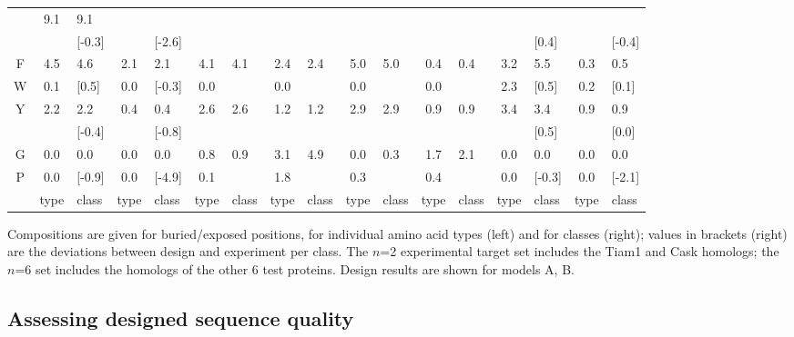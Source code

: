 \documentclass[12pt]{article}
\newcommand{\fn}{\footnotesize}
\begin{document}
\begin{table}
\begin{tabular}{c|clcl|clcl|clcl|clcl}
 & \multirow{2}{*}{9.1} & 9.1\\
 & & [-0.3] & & [-2.6] & & & & & & & & & & [0.4] & & [-0.4]\\ \hline
F  & 4.5 & \multirow{1}{*}{4.6} & 2.1 & \multirow{1}{*}{2.1} & 4.1 & \multirow{2}{*}{4.1} & 2.4 & \multirow{2}{*}{2.4} & 5.0 & \multirow{2}{*}{5.0} & 0.4 & \multirow{2}{*}{0.4} & 3.2 & \multirow{1}{*}{5.5} & 0.3 & \multirow{1}{*}{0.5}\\
W & 0.1 & [0.5] & 0.0 & [-0.3] & 0.0 &  & 0.0 &  & 0.0 &  & 0.0 &  & 2.3 & [0.5] & 0.2 & [0.1]\\
\hline
\multirow{2}{*}{Y} & \multirow{2}{*}{2.2} & 2.2 & \multirow{2}{*}{0.4} & 0.4 & \multirow{2}{*}{2.6} & \multirow{2}{*}{2.6} & \multirow{2}{*}{1.2} & \multirow{2}{*}{1.2} & \multirow{2}{*}{2.9} & \multirow{2}{*}{2.9} & \multirow{2}{*}{0.9} & \multirow{2}{*}{0.9} & \multirow{2}{*}{3.4} & 3.4 & \multirow{2}{*}{0.9} & 0.9\\
 &  & [-0.4] &  & [-0.8] &  &  &  &  &  &  &  &  &  & [0.5] &  & [0.0]\\
\hline
G & 0.0 & \multirow{1}{*}{0.0} & 0.0 & \multirow{1}{*}{0.0} & 0.8 & \multirow{2}{*}{0.9} & 3.1 & \multirow{2}{*}{4.9} & 0.0 & \multirow{2}{*}{0.3} & 1.7 & \multirow{2}{*}{2.1} & 0.0 & \multirow{1}{*}{0.0} & 0.0 & \multirow{1}{*}{0.0}\\
P & 0.0 & [-0.9] & 0.0 & [-4.9] & 0.1 &  & 1.8 &  & 0.3 &  & 0.4 &  & 0.0 & [-0.3] & 0.0 & [-2.1]\\
\hline
 & \fn{type} & \fn{class} & \fn{type} & \fn{class} & \fn{type} & \fn{class} & \fn{type} & \fn{class} 
 & \fn{type} & \fn{class} & \fn{type} & \fn{class} & \fn{type} & \fn{class} & \fn{type} & \fn{class} \\ \hline
\end{tabular} 
{\footnotesize \noindent Compositions are given for buried/exposed positions, for individual amino acid types (left) and for classes
(right); values in brackets (right) are the deviations between design and experiment per class. The $n$=2 experimental target set
includes the Tiam1 and Cask homologs; the $n$=6 set includes the homologs of the other 6 test proteins. Design results are shown for
models A, B.
}
\end{table}

\clearpage

\subsection{Assessing designed sequence quality}
\end{document}
